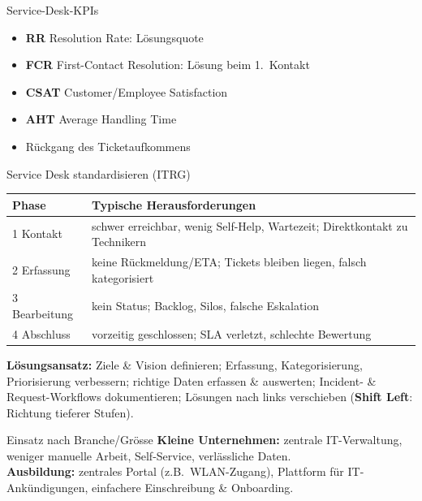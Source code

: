 \documentclass[a4paper, fontsize=7pt]{scrartcl}
\renewcommand*{\arraystretch}{1.5}  %
\begin{document}
\begin{mainbox}{Service-Desk-KPIs}
\begin{itemize}
    \item \textbf{RR} Resolution Rate: Lösungsquote
    \item \textbf{FCR} First-Contact Resolution: Lösung beim 1.\ Kontakt
    \item \textbf{CSAT} Customer/Employee Satisfaction
    \item \textbf{AHT} Average Handling Time
    \item Rückgang des Ticketaufkommens
\end{itemize}
\end{mainbox}

\begin{subbox}{Service Desk standardisieren (ITRG)}
\renewcommand*{\arraystretch}{1.15}
\begin{tabularx}{\linewidth}{@{}l>{\raggedright\arraybackslash}X@{}}
\textbf{Phase} & \textbf{Typische Herausforderungen} \\
\hline
1 Kontakt & schwer erreichbar, wenig Self-Help, Wartezeit; Direktkontakt zu
  Technikern \\
2 Erfassung & keine Rückmeldung/ETA; Tickets bleiben liegen, falsch
  kategorisiert \\
3 Bearbeitung & kein Status; Backlog, Silos, falsche Eskalation \\
4 Abschluss & vorzeitig geschlossen; SLA verletzt, schlechte Bewertung \\
\end{tabularx}
\textbf{Lösungsansatz:} Ziele \& Vision definieren; Erfassung, Kategorisierung,
Priorisierung verbessern; richtige Daten erfassen \& auswerten; Incident- \&
Request-Workflows dokumentieren; Lösungen nach links verschieben (\textbf{Shift
Left}: Richtung tieferer Stufen).
\end{subbox}

\begin{subbox}{Einsatz nach Branche/Grösse}
\textbf{Kleine Unternehmen:} zentrale IT-Verwaltung, weniger manuelle Arbeit,
Self-Service, verlässliche Daten.\\
\textbf{Ausbildung:} zentrales Portal (z.B.\ WLAN-Zugang), Plattform für
IT-Ankündigungen, einfachere Einschreibung \& Onboarding.
\end{subbox}
\end{document}
